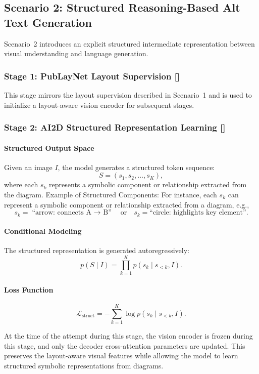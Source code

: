 \documentclass[12pt, titlepage]{article}
\begin{document}
\subsection{Scenario 2: Structured Reasoning-Based Alt Text Generation}

Scenario~2 introduces an explicit structured intermediate representation
between visual understanding and language generation.

\subsubsection{Stage 1: PubLayNet Layout Supervision [\cite{zhong2019publaynet}]}

This stage mirrors the layout supervision described in Scenario~1 and is used
to initialize a layout-aware vision encoder for subsequent stages.

\subsubsection{Stage 2: AI2D Structured Representation Learning [\cite{kembhavi2016diagram}]}

\paragraph{Structured Output Space}
Given an image $I$, the model generates a structured token sequence:
\[
S = (s_1, s_2, \dots, s_K),
\]
where each $s_k$ represents a symbolic component or relationship extracted
from the diagram.
Example of Structured Components: For instance, each $s_k$ can represent a symbolic component or relationship extracted from a diagram, e.g.,
\[
s_k = \text{``arrow: connects A $\rightarrow$ B''} \quad \text{or} \quad
s_k = \text{``circle: highlights key element''}.
\]

\paragraph{Conditional Modeling}
The structured representation is generated autoregressively:
\[
p(S \mid I) = \prod_{k=1}^{K} p(s_k \mid s_{<k}, I).
\]

\paragraph{Loss Function}
\[
\mathcal{L}_{\text{struct}} =
- \sum_{k=1}^{K} \log p(s_k \mid s_{<k}, I).
\]

At the time of the attempt during this stage, the vision encoder is frozen during this stage, and only the decoder cross-attention parameters are updated. This preserves the layout-aware visual features while allowing the model to learn structured symbolic representations from diagrams.
\end{document}
